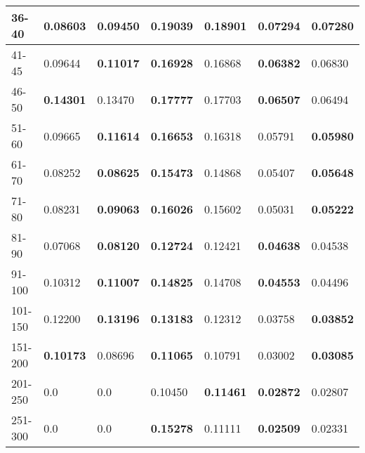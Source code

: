 \begin{table*}[h!]
\begin{tabular}{|l|l|l||l|l||l|l|}
        36-40     & 0.08603                                 & \textbf{0.09450}               & \textbf{0.19039}                 & 0.18901          & \textbf{0.07294} & 0.07280          \\ \hline
        41-45     & 0.09644                                 & \textbf{0.11017}               & \textbf{0.16928}                 & 0.16868          & \textbf{0.06382} & 0.06830          \\ \hline
        46-50     & \textbf{0.14301}                        & 0.13470                        & \textbf{0.17777}                 & 0.17703          & \textbf{0.06507} & 0.06494          \\ \hline
        51-60     & 0.09665                                 & \textbf{0.11614}               & \textbf{0.16653}                 & 0.16318          & 0.05791          & \textbf{0.05980} \\ \hline
        61-70     & 0.08252                                 & \textbf{0.08625}               & \textbf{0.15473}                 & 0.14868          & 0.05407          & \textbf{0.05648} \\ \hline
        71-80     & 0.08231                                 & \textbf{0.09063}               & \textbf{0.16026}                 & 0.15602          & 0.05031          & \textbf{0.05222} \\ \hline
        81-90     & 0.07068                                 & \textbf{0.08120}               & \textbf{0.12724}                 & 0.12421          & \textbf{0.04638} & 0.04538          \\ \hline
        91-100    & 0.10312                                 & \textbf{0.11007}               & \textbf{0.14825}                 & 0.14708          & \textbf{0.04553} & 0.04496          \\ \hline
        101-150   & 0.12200                                 & \textbf{0.13196}               & \textbf{0.13183}                 & 0.12312          & 0.03758          & \textbf{0.03852} \\ \hline
        151-200   & \textbf{0.10173}                        & 0.08696                        & \textbf{0.11065}                 & 0.10791          & 0.03002          & \textbf{0.03085} \\ \hline
        201-250   & 0.0                                     & 0.0                            & 0.10450                          & \textbf{0.11461} & \textbf{0.02872} & 0.02807          \\ \hline
        251-300   & 0.0                                     & 0.0                            & \textbf{0.15278}                 & 0.11111          & \textbf{0.02509} & 0.02331          \\ \hline

\end{tabular}
\end{table*}
